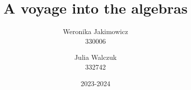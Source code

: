 \documentclass[13pt]{article}
\title{A voyage into the algebras}
\author{
  Weronika Jakimowicz\\
  330006
  \and 
  Julia Walczuk\\
  332742
}
\date{2023-2024}
\begin{document}
\maketitle
\bigskip

%
%
\newpage

%



%



%



 
\end{document}
